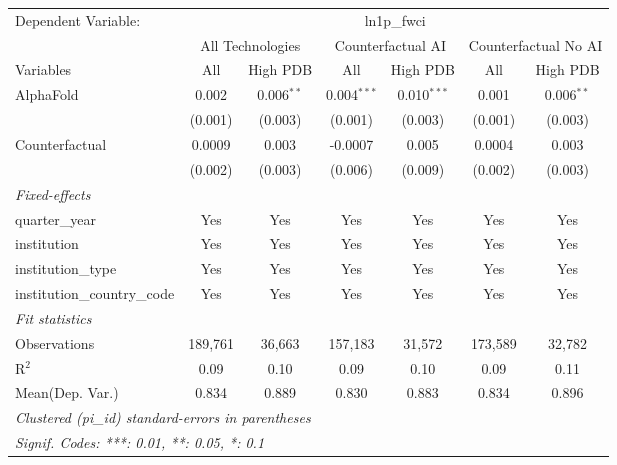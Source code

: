 \begingroup
\centering
\begin{tabular}{lcccccc}
   \tabularnewline \midrule \midrule
   Dependent Variable: & \multicolumn{6}{c}{ln1p\_fwci}\\
 & \multicolumn{2}{c}{All Technologies} & \multicolumn{2}{c}{Counterfactual AI} & \multicolumn{2}{c}{Counterfactual No AI} \\
\cmidrule(lr){1-1}\cmidrule(lr){2-3} \cmidrule(lr){4-5} \cmidrule(lr){6-7}
Variables & \multicolumn{1}{c}{All} & \multicolumn{1}{c}{High PDB} & \multicolumn{1}{c}{All} & \multicolumn{1}{c}{High PDB} & \multicolumn{1}{c}{All} & \multicolumn{1}{c}{High PDB} \\
\cmidrule(lr){1-1}\cmidrule(lr){2-2} \cmidrule(lr){3-3} \cmidrule(lr){4-4} \cmidrule(lr){5-5} \cmidrule(lr){6-6} \cmidrule(lr){7-7}
   AlphaFold                    & 0.002   & 0.006$^{**}$ & 0.004$^{***}$ & 0.010$^{***}$ & 0.001   & 0.006$^{**}$\\   
                                & (0.001) & (0.003)      & (0.001)       & (0.003)       & (0.001) & (0.003)\\   
   Counterfactual               & 0.0009  & 0.003        & -0.0007       & 0.005         & 0.0004  & 0.003\\   
                                & (0.002) & (0.003)      & (0.006)       & (0.009)       & (0.002) & (0.003)\\   
   \midrule
   \emph{Fixed-effects}\\
   quarter\_year                & Yes     & Yes          & Yes           & Yes           & Yes     & Yes\\  
   institution                  & Yes     & Yes          & Yes           & Yes           & Yes     & Yes\\  
   institution\_type            & Yes     & Yes          & Yes           & Yes           & Yes     & Yes\\  
   institution\_country\_code   & Yes     & Yes          & Yes           & Yes           & Yes     & Yes\\  
   \midrule
   \emph{Fit statistics}\\
   Observations                 & 189,761 & 36,663       & 157,183       & 31,572        & 173,589 & 32,782\\  
   R$^2$                        & 0.09    & 0.10         & 0.09          & 0.10          & 0.09    & 0.11\\  
Mean(Dep. Var.) & 0.834 & 0.889 & 0.830 & 0.883 & 0.834 & 0.896 \\
   \midrule \midrule
   \multicolumn{7}{l}{\emph{Clustered (pi\_id) standard-errors in parentheses}}\\
   \multicolumn{7}{l}{\emph{Signif. Codes: ***: 0.01, **: 0.05, *: 0.1}}\\
\end{tabular}
\par\endgroup
